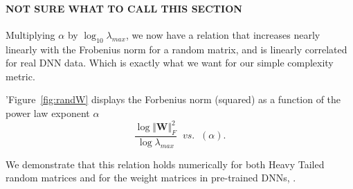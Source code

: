 \paragraph{NOT SURE WHAT TO CALL THIS SECTION}

Multiplying $\alpha$ by $\log_{10}\lambda_{max}$, we now have a relation that increases nearly linearly with the 
Frobenius norm for a random matrix, and is linearly correlated for real DNN data. Which is exactly what we want for our simple complexity metric.

'Figure~\ref{fig:randW} displays the Forbenius norm (squared)  as a function of the power law exponent $\alpha$ 
$$
\dfrac{\log\Vert\mathbf{W}\Vert^{2}_{F}}{\log\lambda_{max}}\;\;vs.\;\;(\alpha)  .
$$


We demonstrate that this relation holds numerically for both Heavy Tailed random matrices and for the weight matrices in pre-trained DNNs, .

